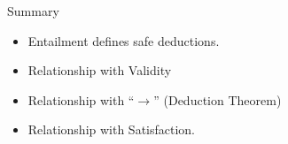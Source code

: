 \documentclass[xetex,aspectratio=169,14pt,hyperref={pdfpagelabels=true,pdflang={en-GB}}]{beamer}
\begin{document}
\begin{frame}
  {Summary}

  \begin{itemize}
  \item Entailment defines safe deductions.
  \item Relationship with Validity
  \item Relationship with ``$\to$'' \quad\textcolor{black!60}{(Deduction Theorem)}
  \item Relationship with Satisfaction.
  \end{itemize}


\end{frame}
\end{document}
